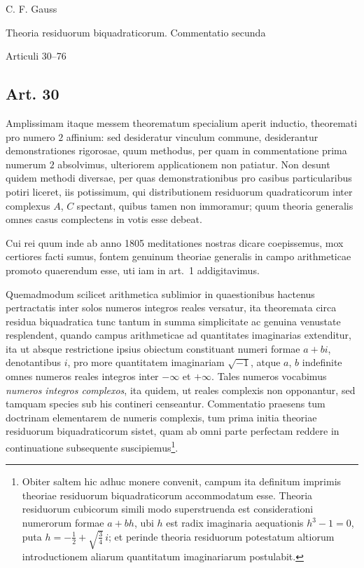\documentclass[12pt]{article}
\newcommand{\art}[1]{\subsection*{Art. #1}}
\begin{document}
\begin{center}
{\Large C. F. Gauss}\par
{\large Theoria residuorum biquadraticorum. Commentatio secunda}\par
{\large Articuli 30--76}
\end{center}

\art{30}

Amplissimam itaque messem theorematum specialium aperit inductio, theoremati pro numero $2$ affinium: sed desideratur vinculum commune, desiderantur demonstrationes rigorosae, quum methodus, per quam in commentatione prima numerum $2$ absolvimus, ulteriorem applicationem non patiatur. Non desunt quidem methodi diversae, per quas demonstrationibus pro casibus particularibus potiri liceret, iis potissimum, qui distributionem residuorum quadraticorum inter complexus $A$, $C$ spectant, quibus tamen non immoramur; quum theoria generalis omnes casus complectens in votis esse debeat.

Cui rei quum inde ab anno 1805 meditationes nostras dicare coepissemus, mox certiores facti sumus, fontem genuinum theoriae generalis in campo arithmeticae promoto quaerendum esse, uti iam in art.~1 addigitavimus.

Quemadmodum scilicet arithmetica sublimior in quaestionibus hactenus pertractatis inter solos numeros integros reales versatur, ita theoremata circa residua biquadratica tunc tantum in summa simplicitate ac genuina venustate resplendent, quando campus arithmeticae ad quantitates imaginarias extenditur, ita ut absque restrictione ipsius obiectum constituant numeri formae $a+bi$, denotantibus $i$, pro more quantitatem imaginariam $\sqrt{-1}$, atque $a$, $b$ indefinite omnes numeros reales integros inter $-\infty$ et $+\infty$. Tales numeros vocabimus \textit{numeros integros complexos}, ita quidem, ut reales complexis non opponantur, sed tamquam species sub his contineri censeantur. Commentatio praesens tum doctrinam elementarem de numeris complexis, tum prima initia theoriae residuorum biquadraticorum sistet, quam ab omni parte perfectam reddere in continuatione subsequente suscipiemus\footnote{Obiter saltem hic adhuc monere convenit, campum ita definitum imprimis theoriae residuorum biquadraticorum accommodatum esse. Theoria residuorum cubicorum simili modo superstruenda est considerationi numerorum formae $a+bh$, ubi $h$ est radix imaginaria aequationis $h^3-1=0$, puta $h=-\frac{1}{2}+\sqrt{\frac{3}{4}}\,i$; et perinde theoria residuorum potestatum altiorum introductionem aliarum quantitatum imaginariarum postulabit.}.
\end{document}
